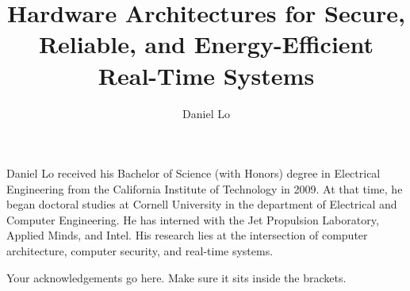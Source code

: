 \documentclass[phd,tocprelim]{cornell}
\title {Hardware Architectures for Secure, Reliable, and Energy-Efficient Real-Time Systems}
\author {Daniel Lo}
\begin{document}
\maketitle
\makecopyright

\begin{abstract}

\end{abstract}

\begin{biosketch}
Daniel Lo received his Bachelor of Science (with Honors) degree in Electrical
Engineering from the California Institute of Technology in 2009. At that time,
he began doctoral studies at Cornell University in the department of Electrical
and Computer Engineering. He has interned with the Jet Propulsion Laboratory,
Applied Minds, and Intel. His research lies at the intersection of computer
architecture, computer security, and real-time systems.
\end{biosketch}

%
%
%


\begin{acknowledgements}
Your acknowledgements go here. Make sure it sits inside the brackets.




\end{acknowledgements}

\contentspage
\tablelistpage
\figurelistpage

\normalspacing \setcounter{page}{1} 
\pagestyle{cornell} \addtolength{\parskip}{0.5\baselineskip}












\end{document}
